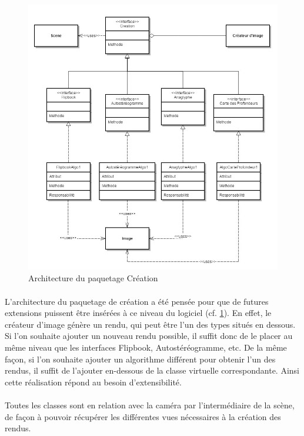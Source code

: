 \begin{figure}[h]
		\centering
		\includegraphics[scale=0.4]{package_creation.jpg}
		\caption{\label{fig:paqCreation} Architecture du paquetage Création}
\end{figure}

\paragraph{}
L’architecture du paquetage de création a été pensée pour que de futures extensions puissent être insérées à ce niveau du logiciel (cf. \ref{fig:paqCreation}). En effet, le créateur d’image génère un rendu, qui peut être l’un des types situés en dessous. Si l’on souhaite ajouter un nouveau rendu possible, il suffit donc de le placer au même niveau que les interfaces Flipbook, Autostéréogramme, etc. De la même façon, si l’on souhaite ajouter un algorithme différent pour obtenir l’un des rendus, il suffit de l’ajouter en-dessous de la classe virtuelle correspondante. Ainsi cette réalisation répond au besoin d’extensibilité.

\paragraph{}
Toutes les classes sont en relation avec la caméra par l’intermédiaire de la scène, de façon à pouvoir récupérer les différentes vues nécessaires à la création des rendus.

